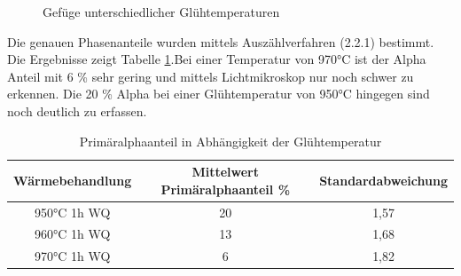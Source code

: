 \documentclass[a4paper, 11pt]{tubsreprt}
\begin{document}
\begin{figure}
\caption{Gefüge unterschiedlicher Glühtemperaturen}
\label{Alle Glühen}
\end{figure}

Die genauen Phasenanteile wurden mittels Auszählverfahren (2.2.1) bestimmt. Die Ergebnisse zeigt Tabelle \ref{Tabelle Primäralphaanteil}.Bei einer Temperatur von 970°C ist der Alpha Anteil mit  6 \% sehr gering und mittels Lichtmikroskop nur noch schwer zu erkennen. Die 20 \% Alpha bei einer Glühtemperatur von 950°C hingegen sind noch deutlich zu erfassen.
\begin{table}
\begin{tabular}{c | c | c}
Wärmebehandlung & Mittelwert Primäralphaanteil \% & Standardabweichung \\
\hline
950°C 1h WQ	& 20 	&	1,57 \\
960°C 1h WQ	& 13 	&	1,68 \\
970°C 1h WQ	& 6  	&	1,82 \\
\end{tabular}
\caption{Primäralphaanteil in Abhängigkeit der Glühtemperatur}
\label{Tabelle Primäralphaanteil}
\end{table}
\end{document}
